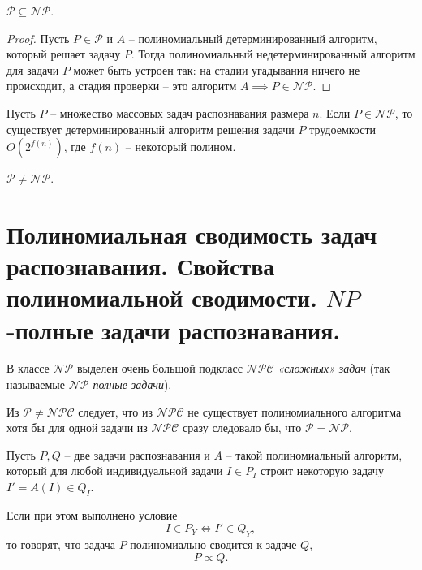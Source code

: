 \begin{theorem}
    $ \mathcal{P} \subseteq \mathcal{NP} $.
\end{theorem}

\begin{proof}
    Пусть $ P \in \mathcal{P} $ и $ A $ -- полиномиальный детерминированный алгоритм, который решает задачу $ P $. Тогда полиномиальный недетерминированный алгоритм для задачи $ P $ может быть устроен так: на стадии угадывания ничего не происходит, а стадия проверки -- это алгоритм $ A \implies P \in \mathcal{NP} $.
\end{proof}

\begin{theorem}
    Пусть $ P $ -- множество массовых задач распознавания размера $ n $. Если $ P \in \mathcal{NP} $, то существует детерминированный алгоритм решения задачи $ P $ трудоемкости $ O(2^{f(n)}) $, где $ f(n) $ -- некоторый полином.
\end{theorem}

\begin{note}[Гипотеза]
    $ \mathcal{P} \ne \mathcal{NP} $.
\end{note}


\section{Полиномиальная сводимость задач распознавания. Свойства полиномиальной сводимости. $NP$-полные задачи распознавания.}

\begin{note}
    В классе $ \mathcal{NP} $ выделен очень большой подкласс $ \mathcal{NPC} $ \emph{«сложных» задач} (так называемые \emph{$ \mathcal{NP} $-полные задачи}).

    Из $ \mathcal{P}\ne \mathcal{NPC} $ следует, что из $ \mathcal{NPC} $ не существует полиномиального алгоритма хотя бы для одной задачи из $ \mathcal{NPC} $ сразу следовало бы, что $ \mathcal{P} = \mathcal{NP} $.
\end{note}

\begin{definition}
    Пусть $ P,Q $ -- две задачи распознавания и $ A $ -- такой полиномиальный алгоритм, который для любой индивидуальной задачи $ I \in P_I $ строит некоторую задачу $ I'= A(I) \in Q_I $.

    Если при этом выполнено условие
    \[
        I \in P_Y \iff I' \in Q_Y,
    \]
    то говорят, что задача $ P $ полиномиально сводится к задаче $ Q $,
    \[
        P\propto Q.
    \]
\end{definition}

